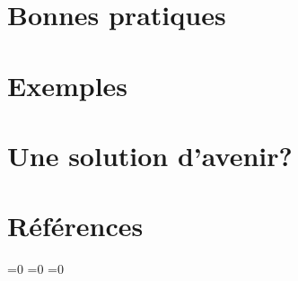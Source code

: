 \documentclass[11pt,a4paper]{article}
\begin{document}
\section{Bonnes pratiques}


\section{Exemples}




%

\section{Une solution d'avenir?}


\nocite{*}
\section{Références}
\begingroup
\renewcommand{\section}[2]{}%


\endgroup

%
%

\makeatletter
\ifnum{}=0
\clearpage
\else\ifnum{}=0
\clearpage
\else\ifnum{}=0
\clearpage
\fi\fi\fi

\end{document}
